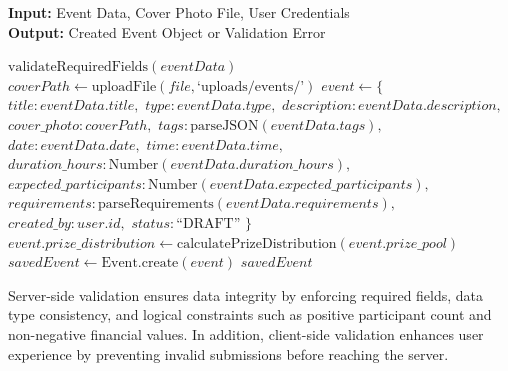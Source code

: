 \begin{algorithm}[H]
\caption{Event Creation and Validation Process}
\label{alg:event_creation}
\textbf{Input:} Event Data, Cover Photo File, User Credentials\\
\textbf{Output:} Created Event Object or Validation Error
\begin{algorithmic}[1]
    \State $\text{validateRequiredFields}(eventData)$
        \State $coverPath \gets \text{uploadFile}(file, \text{`uploads/events/'})$
    \EndIf
    \State $event \gets \{$
    \State \hspace{1em} $title: eventData.title,$
    \State \hspace{1em} $type: eventData.type,$
    \State \hspace{1em} $description: eventData.description,$
    \State \hspace{1em} $cover\_photo: coverPath,$
    \State \hspace{1em} $tags: \text{parseJSON}(eventData.tags),$
    \State \hspace{1em} $date: eventData.date,$
    \State \hspace{1em} $time: eventData.time,$
    \State \hspace{1em} $duration\_hours: \text{Number}(eventData.duration\_hours),$
    \State \hspace{1em} $expected\_participants: \text{Number}(eventData.expected\_participants),$
    \State \hspace{1em} $requirements: \text{parseRequirements}(eventData.requirements),$
    \State \hspace{1em} $created\_by: user.id,$
    \State \hspace{1em} $status: \text{``DRAFT''}$
    \State $\}$
        \State $event.prize\_distribution \gets \text{calculatePrizeDistribution}(event.prize\_pool)$
    \EndIf
    \State $savedEvent \gets \text{Event.create}(event)$
    \State \Return $savedEvent$
\EndFunction
\end{algorithmic}
\end{algorithm}

Server-side validation ensures data integrity by enforcing required fields, data type consistency, and logical constraints such as positive participant count and non-negative financial values. In addition, client-side validation enhances user experience by preventing invalid submissions before reaching the server.

